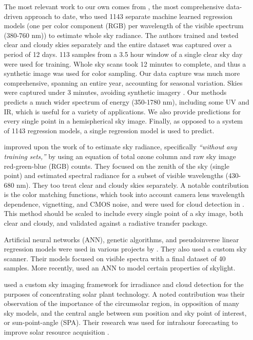 The most relevant work to our own comes from \citet{tohsing_validation_2014}, the most comprehensive data-driven approach to date, who used 1143 separate machine learned regression models (one per color component (RGB) per wavelength of the visible spectrum (380-760 nm)) to estimate whole sky radiance. The authors trained and tested clear and cloudy skies separately and the entire dataset was captured over a period of 12 days. 113 samples from a 3.5 hour window of a single clear sky day were used for training. Whole sky scans took 12 minutes to complete, and thus a synthetic image was used for color sampling. Our data capture was much more comprehensive, spanning an entire year, accounting for seasonal variation. Skies were captured under 3 minutes, avoiding synthetic imagery \citep{delrocco_spie}. Our methods predicts a much wider spectrum of energy (350-1780 nm), including some UV and IR, which is useful for a variety of applications. We also provide predictions for every single point in a hemispherical sky image. Finally, as opposed to a system of 1143 regression models, a single regression model is used to predict.

\citet{saito_estimation_2016} improved upon the work of \citet{sigernes_sensitivity} to estimate sky radiance, specifically \textit{``without any training sets,''} by using an equation of total ozone column and raw sky image red-green-blue (RGB) counts. They focused on the zenith of the sky (single point) and estimated spectral radiance for a subset of visible wavelengths (430-680 nm). They too treat clear and cloudy skies separately. A notable contribution is the color matching functions, which took into account camera lens wavelength dependence, vignetting, and CMOS noise, and were used for cloud detection in \citet{saito_cloud}. This method should be scaled to include every single point of a sky image, both clear and cloudy, and validated against a radiative transfer package.

Artificial neural networks (ANN), genetic algorithms, and pseudoinverse linear regression models were used in various projects by \citet{lopez-alvarez_using_2008, cazorla_using_2008, cazorla_development_2008}. They also used a custom sky scanner. Their models focused on visible spectra with a final dataset of 40 samples. More recently, \citet{satylmys_ann} used an ANN to model certain properties of skylight.

\citet{chauvin_modelling_2015} used a custom sky imaging framework for irradiance and cloud detection for the purposes of concentrating solar plant technology. A noted contribution was their observation of the importance of the circumsolar region, in opposition of many sky models, and the central angle between sun position and sky point of interest, or sun-point-angle (SPA). Their research was used for intrahour forecasting to improve solar resource acquisition \citep{nou_intrahour}.


